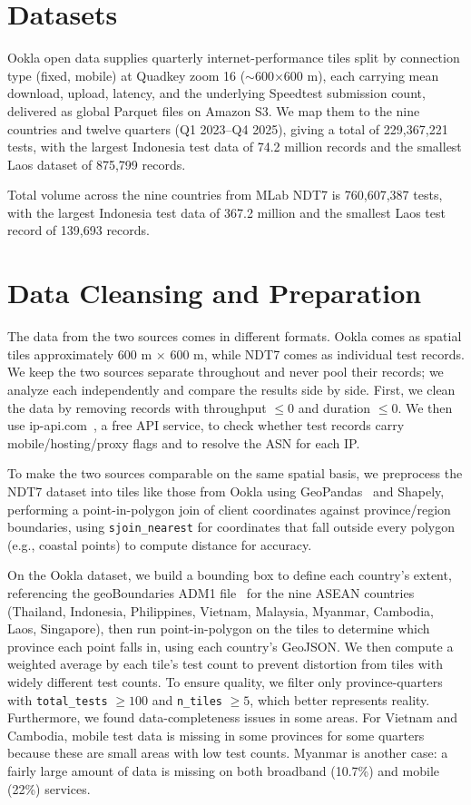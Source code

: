\documentclass[sigconf,anonymous,review]{acmart}
\begin{document}
\section{Datasets}
Ookla open data supplies quarterly internet-performance tiles split by
connection type (fixed, mobile) at Quadkey zoom 16
($\sim$600$\times$600 m), each carrying mean download, upload, latency, and
the underlying Speedtest submission count, delivered as global Parquet
files on Amazon S3. We map them to the nine countries and twelve quarters
(Q1 2023--Q4 2025), giving a total of 229{,}367{,}221 tests, with the
largest Indonesia test data of 74.2 million records and the smallest Laos
dataset of 875{,}799 records.

Total volume across the nine countries from MLab NDT7 is 760{,}607{,}387
tests, with the largest Indonesia test data of 367.2 million and the
smallest Laos test record of 139{,}693 records.

\section{Data Cleansing and Preparation}
The data from the two sources comes in different formats. Ookla comes as
spatial tiles approximately 600 m $\times$ 600 m, while NDT7 comes as
individual test records. We keep the two sources separate throughout and
never pool their records; we analyze each independently and compare the
results side by side. First, we clean the data by removing records with
throughput $\leq 0$ and duration $\leq 0$. We then use
ip-api.com~\cite{IpApi}, a free API service, to check whether test records
carry mobile/hosting/proxy flags and to resolve the ASN for each IP.

To make the two sources comparable on the same spatial basis, we
preprocess the NDT7 dataset into tiles like those from Ookla using
GeoPandas~\cite{GeoPandas2020} and Shapely, performing a point-in-polygon
join of client coordinates against province/region boundaries, using
\texttt{sjoin\_nearest} for coordinates that fall outside every polygon
(e.g., coastal points) to compute distance for accuracy.

On the Ookla dataset, we build a bounding box to define each country's
extent, referencing the geoBoundaries ADM1 file~\cite{Runfola2020} for the
nine ASEAN countries (Thailand, Indonesia, Philippines, Vietnam, Malaysia,
Myanmar, Cambodia, Laos, Singapore), then run point-in-polygon on the tiles
to determine which province each point falls in, using each country's
GeoJSON. We then compute a weighted average by each tile's test count to
prevent distortion from tiles with widely different test counts. To ensure
quality, we filter only province-quarters with \texttt{total\_tests}
$\geq 100$ and \texttt{n\_tiles} $\geq 5$, which better represents reality.
Furthermore, we found data-completeness issues in some areas. For Vietnam
and Cambodia, mobile test data is missing in some provinces for some
quarters because these are small areas with low test counts. Myanmar is
another case: a fairly large amount of data is missing on both broadband
(10.7\%) and mobile (22\%) services.
\end{document}
